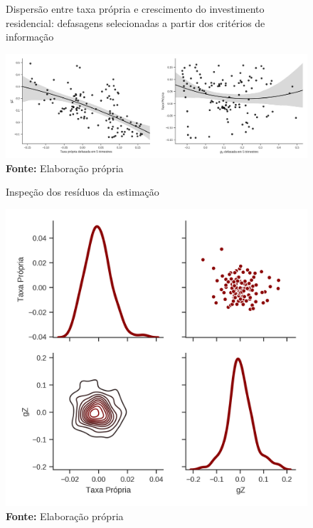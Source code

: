 \begin{figure}[htb]
	\centering
	\caption{Dispersão entre taxa própria e crescimento do investimento residencial: defasagens selecionadas a partir dos critérios de informação}
	\label{defasagens}
	\includegraphics[width=\textwidth]{Fatos_Estilizados/Figs/Scatter_VECM.png}
	\caption*{\textbf{Fonte:} Elaboração própria}
\end{figure}


\begin{figure}[htb]
	\centering
	\caption{Inspeção dos resíduos da estimação}
	\label{residuos}
	\includegraphics[height=.4\textheight]{Fatos_Estilizados/Figs/Residuos_4VECM.png}
	\caption*{\textbf{Fonte:} Elaboração própria}
\end{figure}



